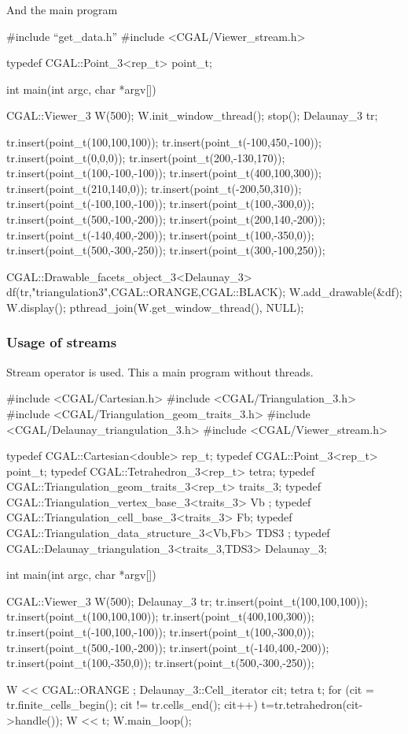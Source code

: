 And the main program
\begin{cprog} 

#include ``get_data.h''
#include <CGAL/Viewer_stream.h>

typedef CGAL::Point_3<rep_t> point_t;

int main(int argc, char *argv[]) 
{
  CGAL::Viewer_3 W(500);
  W.init_window_thread();
  stop();
  Delaunay_3 tr;
  
  tr.insert(point_t(100,100,100));
  tr.insert(point_t(-100,450,-100));
  tr.insert(point_t(0,0,0));
  tr.insert(point_t(200,-130,170));
  tr.insert(point_t(100,-100,-100));
  tr.insert(point_t(400,100,300));
  tr.insert(point_t(210,140,0));
  tr.insert(point_t(-200,50,310));
  tr.insert(point_t(-100,100,-100));
  tr.insert(point_t(100,-300,0));
  tr.insert(point_t(500,-100,-200));
  tr.insert(point_t(200,140,-200));
  tr.insert(point_t(-140,400,-200));
  tr.insert(point_t(100,-350,0));
  tr.insert(point_t(500,-300,-250));
  tr.insert(point_t(300,-100,250));

  CGAL::Drawable_facets_object_3<Delaunay_3>
                     df(tr,"triangulation3",CGAL::ORANGE,CGAL::BLACK);
  W.add_drawable(&df);
  W.display();
  pthread_join(W.get_window_thread(), NULL);
}

\end{cprog} 

\subsubsection{Usage of streams}
Stream operator \ccc{<<} is used. This a main program without threads.
\begin{cprog} 

#include <CGAL/Cartesian.h>
#include <CGAL/Triangulation_3.h>
#include <CGAL/Triangulation_geom_traits_3.h>
#include <CGAL/Delaunay_triangulation_3.h>
#include <CGAL/Viewer_stream.h>

typedef CGAL::Cartesian<double> rep_t;
typedef CGAL::Point_3<rep_t> point_t;
typedef CGAL::Tetrahedron_3<rep_t> tetra;
typedef CGAL::Triangulation_geom_traits_3<rep_t>  traits_3;
typedef CGAL::Triangulation_vertex_base_3<traits_3>     Vb ;
typedef CGAL::Triangulation_cell_base_3<traits_3>       Fb;
typedef CGAL::Triangulation_data_structure_3<Vb,Fb> TDS3 ;
typedef CGAL::Delaunay_triangulation_3<traits_3,TDS3> Delaunay_3;

int main(int argc, char *argv[]) 
{
  CGAL::Viewer_3 W(500);
  Delaunay_3 tr;  
  tr.insert(point_t(100,100,100));
  tr.insert(point_t(100,100,100));
  tr.insert(point_t(400,100,300));
  tr.insert(point_t(-100,100,-100));
  tr.insert(point_t(100,-300,0));
  tr.insert(point_t(500,-100,-200));
  tr.insert(point_t(-140,400,-200));
  tr.insert(point_t(100,-350,0));
  tr.insert(point_t(500,-300,-250));

  W << CGAL::ORANGE ;
  Delaunay_3::Cell_iterator cit;
  tetra t;
  for (cit = tr.finite_cells_begin(); cit != tr.cells_end(); cit++) {
    t=tr.tetrahedron(cit->handle());
    W << t;
  }
 W.main_loop();
}
\end{cprog} 

